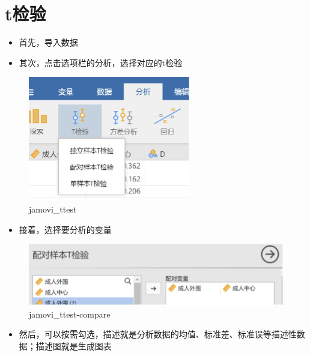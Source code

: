 \documentclass[
]{book}
\providecommand{\tightlist}{%
  \setlength{\itemsep}{0pt}\setlength{\parskip}{0pt}}
\begin{document}
\section{t检验}\label{tux68c0ux9a8c}

\begin{itemize}
\tightlist
\item
  首先，导入数据
\item
  其次，点击选项栏的分析，选择对应的t检验
\end{itemize}

\begin{figure}
\centering
\includegraphics{img/jamovi/ttest.png}
\caption{jamovi\_ttest}
\end{figure}

\begin{itemize}
\tightlist
\item
  接着，选择要分析的变量
\end{itemize}

\begin{figure}
\centering
\includegraphics{img/jamovi/ttest-compare.png}
\caption{jamovi\_ttest-compare}
\end{figure}

\begin{itemize}
\tightlist
\item
  然后，可以按需勾选，描述就是分析数据的均值、标准差、标准误等描述性数据；描述图就是生成图表
\end{itemize}
\end{document}
